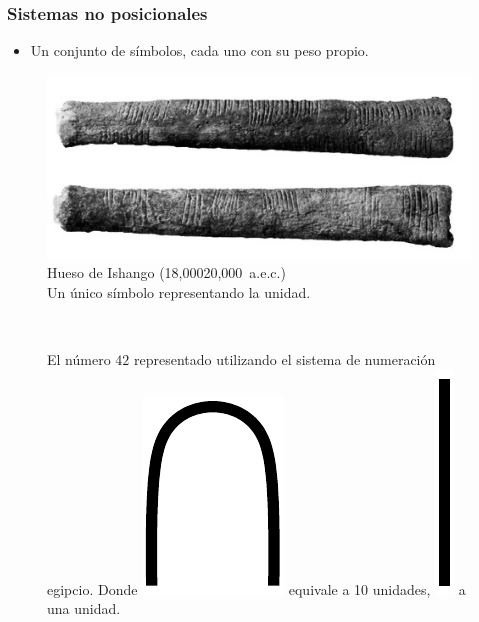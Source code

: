 \documentclass[11pt,a4paper,spanish]{beamer}
\newcommand{\aprox}{\raisebox{0.5ex}{\texttildelow}}
\begin{document}
\begin{frame}

\frametitle{Sistemas no posicionales}

\begin{itemize}
    \item Un conjunto de símbolos, cada uno con su peso propio.
\end{itemize}

\begin{minipage}{0.45\textwidth}
\begin{figure}
    \centering
    \includegraphics[width=1.0\textwidth]{img/ishango.jpg}
    \captionsetup{textfont=tiny,labelformat=empty,justification=centering}
    \caption{Hueso de Ishango (18,000{\aprox}20,000~a.e.c.)\ccbysa\cite{ishango}\\
    Un único símbolo representando la unidad.}
\end{figure}
\end{minipage}
~
\begin{minipage}{0.45\textwidth}
\begin{figure}
    \centering
    \captionsetup{textfont=tiny,labelformat=empty,justification=centering}
    \caption{El número $42$ representado utilizando el sistema de numeración
    egipcio. Donde
    \includegraphics[scale=.05]{styles/egyptian/egypt_heel.pdf}
    equivale a 10 unidades,
    \includegraphics[scale=.05]{styles/egyptian/egypt_stroke.pdf}
    a una unidad.}
\end{figure}
\end{minipage}


\end{frame}
\end{document}

